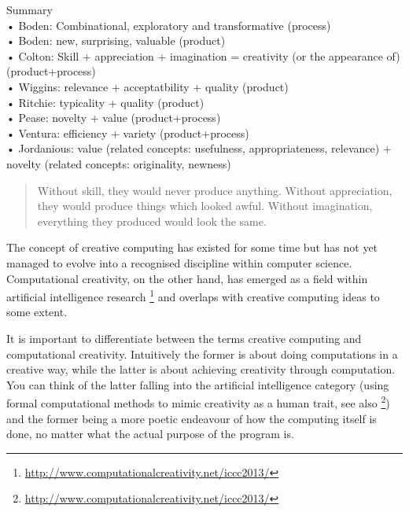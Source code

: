 \begin{shaded}
  Summary\\
  •	Boden: Combinational, exploratory and transformative \citep{Boden2003, Wiggins2006} (process)\\
  •	Boden: new, surprising, valuable \citep{Boden2003} (product)\\
  •	Colton: Skill + appreciation + imagination = creativity (or the appearance of) \citep{Colton2008a} (product+process)\\
  •	Wiggins: relevance + acceptatbility + quality \citep{Wiggins2006} (product)\\
  •	Ritchie: typicality + quality \citep{Ritchie2001, Ritchie2007} (product)\\
  •	Pease: novelty + value \citep{Pease2001} (product+process)\\
  •	Ventura: efficiency + variety \citep{Ventura2008} (product+process)\\
  •	Jordanious: value (related concepts: usefulness, appropriateness, relevance) + novelty (related concepts: originality, newness) \citep{Jordanous2012}
\end{shaded}

\begin{quote}
  Without skill, they would never produce anything. Without appreciation, they would produce things which looked awful. Without imagination, everything they produced would look the same. \citep{Colton2008}
\end{quote}


The concept of creative computing has existed for some time but has not yet managed to evolve into a recognised discipline within computer science. Computational creativity, on the other hand, has emerged as a field within artificial intelligence research \footnote{\url{http://www.computationalcreativity.net/iccc2013/}} and overlaps with creative computing ideas to some extent.

It is important to differentiate between the terms creative computing and computational creativity. Intuitively the former is about doing computations in a creative way, while the latter is about achieving creativity through computation. You can think of the latter falling into the artificial intelligence category (using formal computational methods to mimic creativity as a human trait, see also \footnote{\url{http://www.computationalcreativity.net/iccc2013/}}) and the former being a more poetic endeavour of how the computing itself is done, no matter what the actual purpose of the program is.

